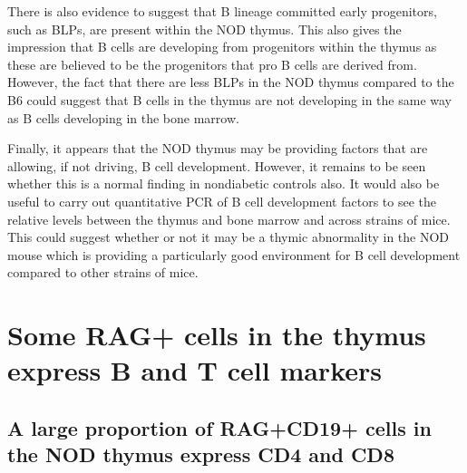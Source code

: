 There is also evidence to suggest that B lineage committed early progenitors, such as BLPs, are present within the NOD thymus. 
This also gives the impression that B cells are developing from progenitors within the thymus as these are believed to be the progenitors that pro B cells are derived from.
However, the fact that there are less BLPs in the NOD thymus compared to the B6 could suggest that B cells in the thymus are not developing in the same way as B cells developing in the bone marrow.

Finally, it appears that the NOD thymus may be providing factors that are allowing, if not driving, B cell development.
However, it remains to be seen whether this is a normal finding in nondiabetic controls also.
It would also be useful to carry out quantitative PCR of B cell development factors to see the relative levels between the thymus and bone marrow and across strains of mice.
This could suggest whether or not it may be a thymic abnormality in the NOD mouse which is providing a particularly good environment for B cell development compared to other strains of mice.

\section{Some RAG+ cells in the thymus express B and T cell markers}


\subsection{A large proportion of RAG+CD19+ cells in the NOD thymus express CD4 and CD8}

